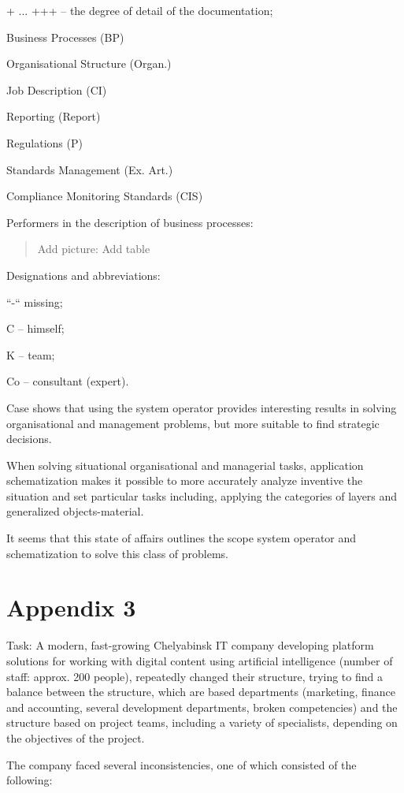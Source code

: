 \documentclass[11pt,a4paper]{book}
\newcommand{\addpicture}[1]{
  \begin{quote} Add picture: #1\end{quote}
}
\begin{document}
+ ... +++ -- the degree of detail of the documentation;

Business Processes (BP)

Organisational Structure (Organ.)

Job Description (CI)

Reporting (Report)

Regulations (P)

Standards Management (Ex. Art.)

Compliance Monitoring Standards (CIS)

Performers in the description of business processes:

\addpicture{Add table}

Designations and abbreviations:

“-“ missing;

C -- himself;

K -- team;

Co -- consultant (expert).

Case shows that using the system operator provides interesting results in
solving organisational and management problems, but more suitable to find
strategic decisions.

When solving situational organisational and managerial tasks, application
schematization makes it possible to more accurately analyze inventive the
situation and set particular tasks including, applying the categories of
layers and generalized objects-material.

It seems that this state of affairs outlines the scope system operator and
schematization to solve this class of problems.

\chapter{Appendix 3}

Task: A modern, fast-growing Chelyabinsk IT company developing platform
solutions for working with digital content using artificial intelligence
(number of staff: approx. 200 people), repeatedly changed their structure,
trying to find a balance between the structure, which are based departments
(marketing, finance and accounting, several development departments, broken
competencies) and the structure based on project teams, including a variety of
specialists, depending on the objectives of the project.

The company faced several inconsistencies, one of which consisted of the
following:
\end{document}
